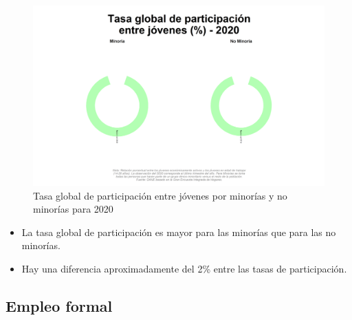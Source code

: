     \begin{figure}[H]
        \caption{Tasa global de participación entre jóvenes por minorías y no minorías para 2020 \label{map_result_2} }
        \begin{center}
        \includegraphics[width=\textwidth,keepaspectratio]{img/var_84_static.png}
        \end{center}
    \end{figure}
            \begin{itemize}
                \item La tasa global de participación es mayor para las minorías que para las no minorías.
                \item Hay una diferencia aproximadamente del 2\% entre las tasas de participación.
                \end{itemize}

    \subsection{Empleo formal}

